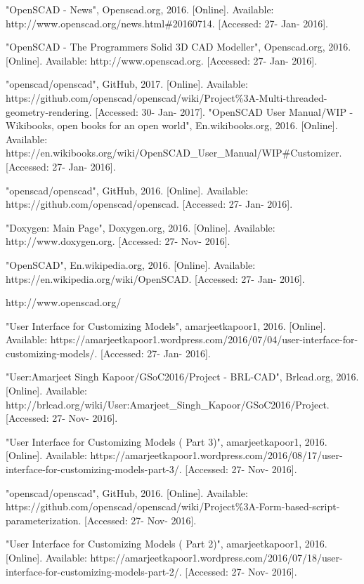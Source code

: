  
\begin{thebibliography}{22}


\bibitem{} "OpenSCAD - News", Openscad.org, 2016. [Online]. Available: http://www.openscad.org/news.html\#20160714. [Accessed: 27- Jan- 2016].

\bibitem{} "OpenSCAD - The Programmers Solid 3D CAD Modeller", Openscad.org, 2016. [Online]. Available: http://www.openscad.org. [Accessed: 27- Jan- 2016].

\bibitem{} "openscad/openscad", GitHub, 2017. [Online]. Available: https://github.com/openscad/openscad/wiki/Project\%3A-Multi-threaded-geometry-rendering. [Accessed: 30- Jan- 2017].
\bibitem{} "OpenSCAD User Manual/WIP - Wikibooks, open books for an open world", En.wikibooks.org, 2016. [Online]. Available: https://en.wikibooks.org/wiki/OpenSCAD\_User\_Manual/WIP\#Customizer. [Accessed: 27- Jan- 2016].

\bibitem{} "openscad/openscad", GitHub, 2016. [Online]. Available: https://github.com/openscad/openscad. [Accessed: 27- Jan- 2016].

\bibitem{} "Doxygen: Main Page", Doxygen.org, 2016. [Online]. Available: http://www.doxygen.org. [Accessed: 27- Nov- 2016].

\bibitem{} "OpenSCAD", En.wikipedia.org, 2016. [Online]. Available: https://en.wikipedia.org/wiki/OpenSCAD. [Accessed: 27- Jan- 2016].

\bibitem{} http://www.openscad.org/


\bibitem{} "User Interface for Customizing Models", amarjeetkapoor1, 2016. [Online]. Available: https://amarjeetkapoor1.wordpress.com/2016/07/04/user-interface-for-customizing-models/. [Accessed: 27- Jan- 2016].


\bibitem{} "User:Amarjeet Singh Kapoor/GSoC2016/Project - BRL-CAD", Brlcad.org, 2016. [Online]. Available: http://brlcad.org/wiki/User:Amarjeet\_Singh\_Kapoor/GSoC2016/Project. [Accessed: 27- Nov- 2016].

\bibitem{} "User Interface for Customizing Models ( Part 3)", amarjeetkapoor1, 2016. [Online]. Available: https://amarjeetkapoor1.wordpress.com/2016/08/17/user-interface-for-customizing-models-part-3/. [Accessed: 27- Nov- 2016].

\bibitem{} "openscad/openscad", GitHub, 2016. [Online]. Available: https://github.com/openscad/openscad/wiki/Project\%3A-Form-based-script-parameterization. [Accessed: 27- Nov- 2016].

\bibitem{} "User Interface for Customizing Models ( Part 2)", amarjeetkapoor1, 2016. [Online]. Available: https://amarjeetkapoor1.wordpress.com/2016/07/18/user-interface-for-customizing-models-part-2/. [Accessed: 27- Nov- 2016].


\end{thebibliography}
